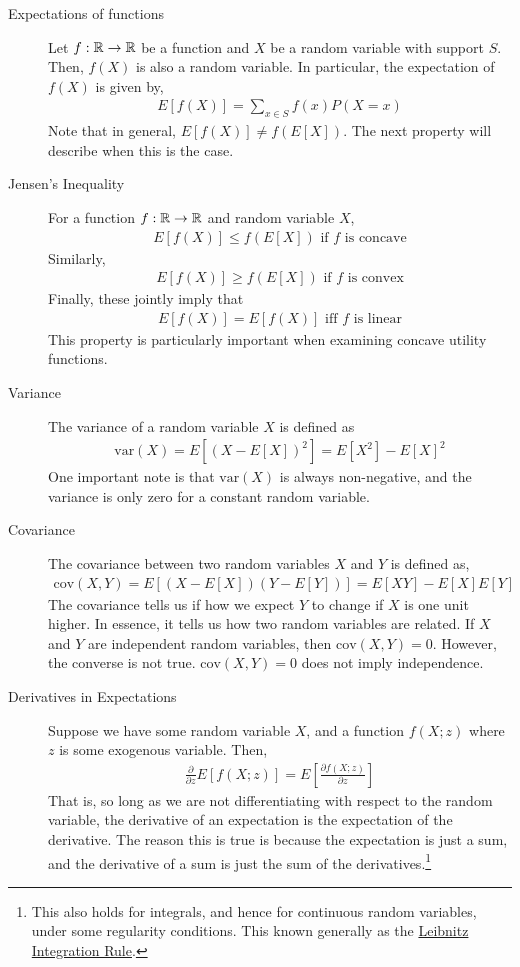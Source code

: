 \begin{description}
    \item[Expectations of functions] Let $f: \mathbb{R} \to \mathbb{R}$ be a function and $X$ be a random variable with support $S$. Then, $f(X)$ is also a random variable. In particular, the expectation of $f(X)$ is given by,
    \begin{align*}
        E[f(X)] = \sum_{x \in S} f(x) P(X = x)
    \end{align*} 
    Note that in general, $E[f(X)] \neq f(E[X])$. The next property will describe when this is the case.
    \item[Jensen's Inequality] For a function $f: \mathbb{R} \to \mathbb{R}$ and random variable $X$, 
    \begin{align*}
        E[f(X)] \leq f(E[X]) \text{ if $f$ is concave}
    \end{align*}
    Similarly,
    \begin{align*}
        E[f(X)] \geq f(E[X]) \text{ if $f$ is convex}
    \end{align*}
    Finally, these jointly imply that
    \begin{align*}
        E[f(X)] = E[f(X)] \text{ iff $f$ is linear}
    \end{align*}
    This property is particularly important when examining concave utility functions. 
    \item[Variance] The variance of a random variable $X$ is defined as
    \begin{align*}
        \text{var}(X) = E[(X - E[X])^2] = E[X^2] - E[X]^2
    \end{align*} 
    One important note is that $\text{var}(X)$ is always non-negative, and the variance is only zero for a constant random variable.
    \item[Covariance] The covariance between two random variables $X$ and $Y$ is defined as,
    \begin{align*}
        \text{cov}(X, Y) = E[(X - E[X])(Y - E[Y])] = E[XY] - E[X]E[Y]
    \end{align*} 
    The covariance tells us if how we expect $Y$ to change if $X$ is one unit higher. In essence, it tells us how two random variables are related. If $X$ and $Y$ are independent random variables, then $\text{cov}(X, Y) = 0$. However, the converse is not true. $\text{cov}(X, Y) = 0$ does not imply independence.
    \item[Derivatives in Expectations] Suppose we have some random variable $X$, and a function $f(X; z)$ where $z$ is some exogenous variable. Then,
    \begin{align*}
        \frac{\partial}{\partial z} E[f(X; z)] = E\left[\frac{\partial f(X; z)}{\partial z}\right]
    \end{align*} 
    That is, so long as we are not differentiating with respect to the random variable, the derivative of an expectation is the expectation of the derivative. The reason this is true is because the expectation is just a sum, and the derivative of a sum is just the sum of the derivatives.\footnote{This also holds for integrals, and hence for continuous random variables, under some regularity conditions. This known generally as the \href{https://en.wikipedia.org/wiki/Leibniz_integral_rule}{Leibnitz Integration Rule}. } 
\end{description}

